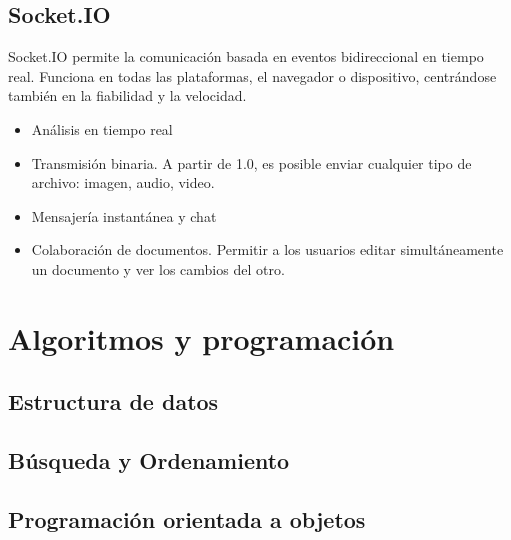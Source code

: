 \subsection{Socket.IO}

Socket.IO permite la comunicación basada en eventos bidireccional en tiempo real.
Funciona en todas las plataformas, el navegador o dispositivo, centrándose también en la fiabilidad y la velocidad.
\begin{itemize}
  \item Análisis en tiempo real
  \item Transmisión binaria. A partir de 1.0, es posible enviar cualquier tipo de archivo: imagen, audio, video.
  \item Mensajería instantánea y chat
  \item Colaboración de documentos. Permitir a los usuarios editar simultáneamente un documento y ver los cambios del otro.
\end{itemize}





\section{Algoritmos y programación}
\subsection{Estructura de datos}
\subsection{Búsqueda y Ordenamiento}
\subsection{Programación orientada a objetos}
